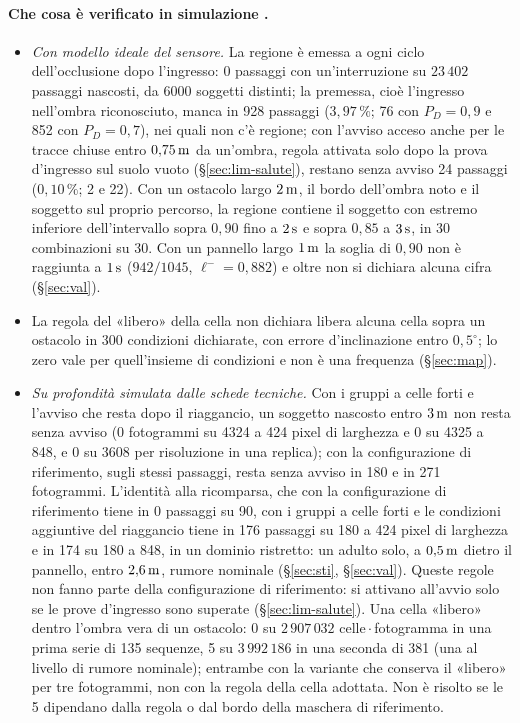 \paragraph{Che cosa è verificato in simulazione .}
\begin{itemize}
\item \emph{Con modello ideale del sensore.} La regione è emessa a ogni ciclo dell'occlusione dopo l'ingresso: 0 passaggi con un'interruzione su $23\,402$ passaggi nascosti, da 6000 soggetti distinti; la premessa, cioè l'ingresso nell'ombra riconosciuto, manca in 928 passaggi ($3{,}97\,\%$; 76 con $P_D=0{,}9$ e 852 con $P_D=0{,}7$), nei quali non c'è regione; con l'avviso acceso anche per le tracce chiuse entro $0{,}75\,\mathrm{m}$ da un'ombra, regola attivata solo dopo la prova d'ingresso sul suolo vuoto (\S\ref{sec:lim-salute}), restano senza avviso 24 passaggi ($0{,}10\,\%$; 2 e 22). Con un ostacolo largo $2\,\mathrm{m}$, il bordo dell'ombra noto e il soggetto sul proprio percorso, la regione contiene il soggetto con estremo inferiore dell'intervallo sopra $0{,}90$ fino a $2\,\mathrm{s}$ e sopra $0{,}85$ a $3\,\mathrm{s}$, in 30 combinazioni su 30. Con un pannello largo $1\,\mathrm{m}$ la soglia di $0{,}90$ non è raggiunta a $1\,\mathrm{s}$ ($942/1045$, $\ell^-=0{,}882$) e oltre non si dichiara alcuna cifra (\S\ref{sec:val}).
\item La regola del «libero» della cella non dichiara libera alcuna cella sopra un ostacolo in 300 condizioni dichiarate, con errore d'inclinazione entro $0{,}5^\circ$; lo zero vale per quell'insieme di condizioni e non è una frequenza (\S\ref{sec:map}).
\item \emph{Su profondità simulata dalle schede tecniche.} Con i gruppi a celle forti e l'avviso che resta dopo il riaggancio, un soggetto nascosto entro $3\,\mathrm{m}$ non resta senza avviso (0 fotogrammi su 4324 a 424 pixel di larghezza e 0 su 4325 a 848, e 0 su 3608 per risoluzione in una replica); con la configurazione di riferimento, sugli stessi passaggi, resta senza avviso in 180 e in 271 fotogrammi. L'identità alla ricomparsa, che con la configurazione di riferimento tiene in 0 passaggi su 90, con i gruppi a celle forti e le condizioni aggiuntive del riaggancio tiene in 176 passaggi su 180 a 424 pixel di larghezza e in 174 su 180 a 848, in un dominio ristretto: un adulto solo, a $0{,}5\,\mathrm{m}$ dietro il pannello, entro $2{,}6\,\mathrm{m}$, rumore nominale (\S\ref{sec:sti}, \S\ref{sec:val}). Queste regole non fanno parte della configurazione di riferimento: si attivano all'avvio solo se le prove d'ingresso sono superate (\S\ref{sec:lim-salute}). Una cella «libero» dentro l'ombra vera di un ostacolo: 0 su $2\,907\,032$ celle\,$\cdot$\,fotogramma in una prima serie di 135 sequenze, 5 su $3\,992\,186$ in una seconda di 381 (una al livello di rumore nominale); entrambe con la variante che conserva il «libero» per tre fotogrammi, non con la regola della cella adottata. Non è risolto se le 5 dipendano dalla regola o dal bordo della maschera di riferimento.

\end{itemize}
